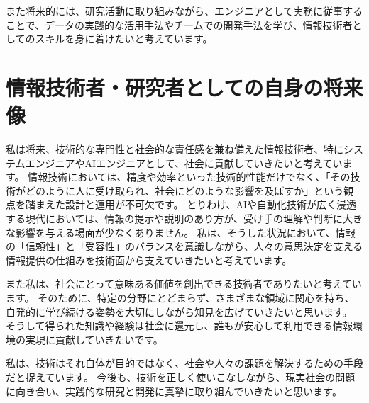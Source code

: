 \documentclass[dvipdfmx]{jarticle}
\begin{document}
また将来的には、研究活動に取り組みながら、エンジニアとして実務に従事することで、データの実践的な活用手法やチームでの開発手法を学び、情報技術者としてのスキルを身に着けたいと考えています。

\section{情報技術者・研究者としての自身の将来像}
私は将来、技術的な専門性と社会的な責任感を兼ね備えた情報技術者、特にシステムエンジニアやAIエンジニアとして、社会に貢献していきたいと考えています。
情報技術においては、精度や効率といった技術的性能だけでなく、「その技術がどのように人に受け取られ、社会にどのような影響を及ぼすか」という観点を踏まえた設計と運用が不可欠です。
とりわけ、AIや自動化技術が広く浸透する現代においては、情報の提示や説明のあり方が、受け手の理解や判断に大きな影響を与える場面が少なくありません。
私は、そうした状況において、情報の「信頼性」と「受容性」のバランスを意識しながら、人々の意思決定を支える情報提供の仕組みを技術面から支えていきたいと考えています。

また私は、社会にとって意味ある価値を創出できる技術者でありたいと考えています。
そのために、特定の分野にとどまらず、さまざまな領域に関心を持ち、自発的に学び続ける姿勢を大切にしながら知見を広げていきたいと思います。
そうして得られた知識や経験は社会に還元し、誰もが安心して利用できる情報環境の実現に貢献していきたいです。

私は、技術はそれ自体が目的ではなく、社会や人々の課題を解決するための手段だと捉えています。
今後も、技術を正しく使いこなしながら、現実社会の問題に向き合い、実践的な研究と開発に真摯に取り組んでいきたいと思います。
\end{document}
